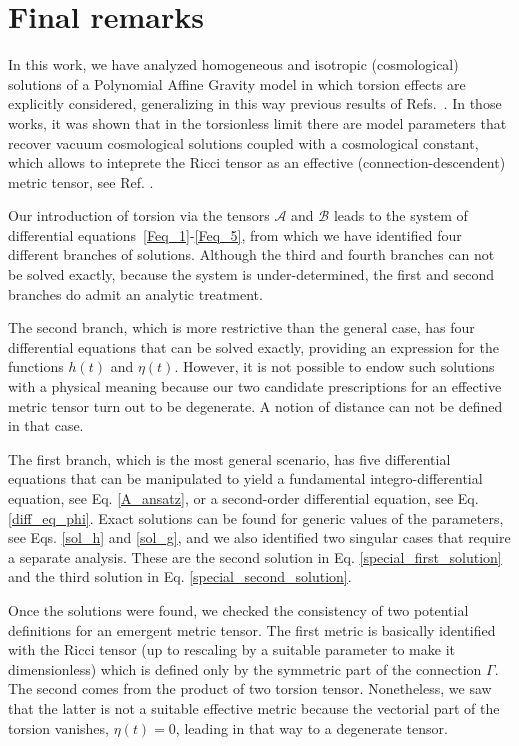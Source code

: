 \documentclass[epj]{svjour}
\begin{document}
\section{Final remarks}\label{sec:final_remarks}
In this work, we have analyzed homogeneous and isotropic (cosmological) solutions of a 
Polynomial Affine Gravity model in which torsion effects are explicitly considered, generalizing in this way previous results of Refs.~\cite{castillofelisola2019cosmological,Castillo_Felisola_2020}. In those works, it was shown that in the torsionless limit there are model parameters that recover vacuum cosmological solutions coupled with a cosmological constant, which allows to inteprete the Ricci tensor as an effective (connection-descendent) metric tensor, see Ref. \cite{Castillo_Felisola_2020,castillofelisola2023inflationary}.

Our introduction of torsion via the tensors \(\mathcal{A}\) and \(\mathcal{B}\) leads to the system of differential equations~\eqref{Feq_1}-\eqref{Feq_5}, from which we have identified four different branches of solutions. Although the third and fourth branches can not be solved exactly, because the system is under-determined, the first and second branches do admit an analytic treatment.

The second branch, which is more restrictive than the general case, has four differential equations that can be solved exactly, providing an expression for the functions $h(t)$ and $\eta(t)$. However, it is not possible to endow such solutions with a physical meaning because our two candidate prescriptions for an effective metric tensor turn out to be degenerate. A notion of distance can not be defined in that case. 

The first branch, which is the most general scenario, has five differential equations that can be
manipulated to yield a fundamental integro-differential equation, see Eq. \eqref{A_ansatz}, or a second-order differential equation, see Eq. \eqref{diff_eq_phi}. Exact solutions can be found for generic values of the parameters, see Eqs. \eqref{sol_h} and \eqref{sol_g}, and we also identified two singular cases that require a separate analysis. These are the second solution in Eq. \eqref{special_first_solution} and the third solution in Eq. \eqref{special_second_solution}.

Once the solutions were found, we checked the consistency of two potential definitions for an emergent metric tensor. The first metric is basically identified with the Ricci tensor (up to rescaling by a suitable parameter to make it dimensionless) which is defined only by the symmetric part of the connection $\Gamma$. The second comes from the product of two torsion tensor. Nonetheless, we saw that the latter is not a suitable effective metric because the vectorial part of the torsion vanishes, $\eta (t) = 0$, leading in that way to a degenerate tensor.
\end{document}
